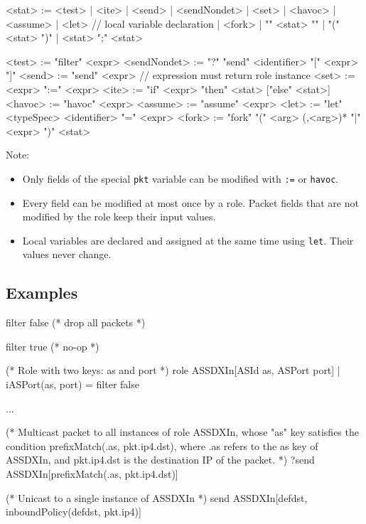 \documentclass{report}
\begin{document}
\begin{bnflisting}{}
<stat> := <test> 
        | <ite>
        | <send>
        | <sendNondet>
        | <set>
        | <havoc>
        | <assume>
        | <let>           // local variable declaration
        | <fork>
        | "{" <stat> "}"
        | "(" <stat> ")"
        | <stat> ";" <stat>

<test>       := "filter" <expr>
<sendNondet> := "?" "send" <identifier> "[" <expr> "]"
<send>       := "send" <expr> // expression must return role instance
<set>        := <expr> ":=" <expr>
<ite>        := "if" <expr> "then" <stat> ["else" <stat>]
<havoc>      := "havoc" <expr>
<assume>     := "assume" <expr>
<let>        := "let" <typeSpec> <identifier> "=" <expr>
<fork>       := "fork" "(" <arg> (,<arg>)* "|" <expr> ")" <stat>
\end{bnflisting}

Note:
\begin{itemize}
    \item Only fields of the special \texttt{pkt} variable can be modified 
        with \texttt{:=} or \texttt{havoc}.
    \item Every field can be modified at most once by a role.  Packet fields
        that are not modified by the role keep their input values.        
    \item Local variables are declared and assigned at the same time using 
        \texttt{let}.  Their values never change.
\end{itemize}

\subsection*{Examples}

\begin{dllisting}{}
filter false (* drop all packets *)
\end{dllisting}

\begin{dllisting}{}
filter true (* no-op *)
\end{dllisting}

\begin{dllisting}{}
(* Role with two keys: as and port *)
role ASSDXIn[ASId as, ASPort port] | iASPort(as, port) = filter false

...

(* Multicast packet to all instances of role ASSDXIn, whose "as" key satisfies the
   condition prefixMatch(.as, pkt.ip4.dst), where .as refers to the as key
   of ASSDXIn, and pkt.ip4.dst is the destination IP of the packet.  *)
?send ASSDXIn[prefixMatch(.as, pkt.ip4.dst)]

(* Unicast to a single instance of ASSDXIn *)
send ASSDXIn[defdst, inboundPolicy(defdst, pkt.ip4)]
\end{dllisting}
\end{document}
